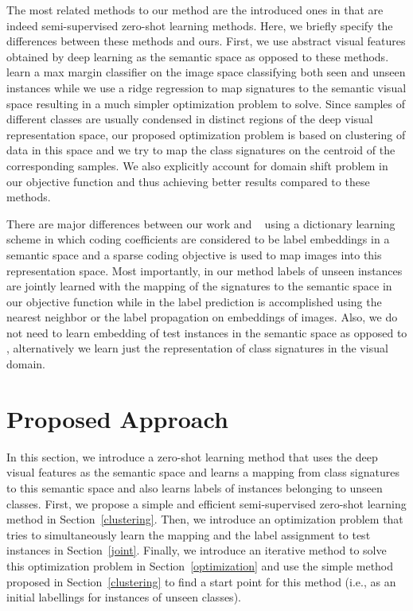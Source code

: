 \documentclass[10pt,twocolumn,letterpaper]{article}
\begin{document}
 The most related methods to our method are the introduced ones in \cite{li15max, semi15, Kodirov2015} that are indeed semi-supervised zero-shot learning methods. Here, we briefly specify the differences between these methods and ours. First, we use abstract visual features obtained by deep learning as the semantic space as opposed to these methods. \cite{li15max, semi15}
learn a max margin classifier on the image space classifying both seen and unseen instances while we use a ridge regression to map signatures to the semantic visual space resulting in a much simpler optimization problem to solve. Since samples of different classes are usually condensed in distinct regions of the deep visual representation space, our proposed optimization problem is based on clustering of data in this space and we try to map the class signatures on the centroid of the corresponding samples. We also explicitly account for domain shift problem in our objective function and thus achieving better results compared to these methods.

There are major differences between our work and ~\cite{Kodirov2015} using a dictionary learning scheme
in which coding coefficients are considered to be label embeddings in a semantic space
and a sparse coding objective is used to map images into this representation space.
Most importantly, in our method labels of unseen instances are jointly learned
with the mapping of the signatures to the semantic space in our objective function while in \cite{Kodirov2015}
the label prediction is accomplished using the nearest neighbor or the label propagation on embeddings of images.
Also, we do not need to learn embedding of test instances in the semantic space as opposed to \cite{Kodirov2015},
alternatively we learn just the representation of class signatures in the visual domain.

\section{Proposed Approach} \label{proposed}
In this section, we introduce a zero-shot learning method that uses the deep visual features as the semantic space and learns
a mapping from class signatures to this semantic space and also learns labels of instances belonging to unseen classes.
 First, we propose a simple and efficient semi-supervised zero-shot learning method in Section~\ref{clustering}.
  Then, we introduce an optimization problem that tries to simultaneously learn the mapping and the label assignment to test instances in Section~\ref{joint}.
   Finally, we introduce an iterative method to solve this optimization problem in Section~\ref{optimization}
   and use the simple method proposed in Section~\ref{clustering} to find a start point for this method (i.e., as an initial labellings for instances of unseen classes).
\end{document}
